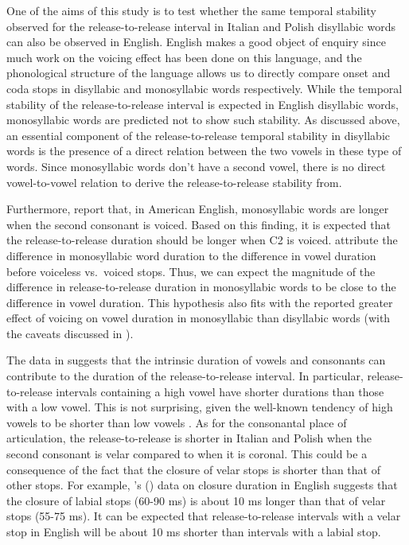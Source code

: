\documentclass[12pt,a4paper,]{article}
\begin{document}
One of the aims of this study is to test whether the same temporal
stability observed for the release-to-release interval in Italian and
Polish disyllabic words can also be observed in English. English makes a
good object of enquiry since much work on the voicing effect has been
done on this language, and the phonological structure of the language
allows us to directly compare onset and coda stops in disyllabic and
monosyllabic words respectively. While the temporal stability of the
release-to-release interval is expected in English disyllabic words,
monosyllabic words are predicted not to show such stability. As
discussed above, an essential component of the release-to-release
temporal stability in disyllabic words is the presence of a direct
relation between the two vowels in these type of words. Since
monosyllabic words don't have a second vowel, there is no direct
vowel-to-vowel relation to derive the release-to-release stability from.

Furthermore, \citet{jacewicz2009} report that, in American English,
monosyllabic words are longer when the second consonant is voiced. Based
on this finding, it is expected that the release-to-release duration
should be longer when C2 is voiced. \citet{jacewicz2009} attribute the
difference in monosyllabic word duration to the difference in vowel
duration before voiceless vs.~voiced stops. Thus, we can expect the
magnitude of the difference in release-to-release duration in
monosyllabic words to be close to the difference in vowel duration. This
hypothesis also fits with the reported greater effect of voicing on
vowel duration in monosyllabic than disyllabic words (with the caveats
discussed in ).

The data in \citet{coretta2019k} suggests that the intrinsic duration of
vowels and consonants can contribute to the duration of the
release-to-release interval. In particular, release-to-release intervals
containing a high vowel have shorter durations than those with a low
vowel. This is not surprising, given the well-known tendency of high
vowels to be shorter than low vowels
\citep{hertrich1997, esposito2002, mortensen2013, toivonen2015, kawahara2017}.
As for the consonantal place of articulation, the release-to-release is
shorter in Italian and Polish when the second consonant is velar
compared to when it is coronal. This could be a consequence of the fact
that the closure of velar stops is shorter than that of other stops. For
example, \citeauthor{sharf1962}'s (\citeyear{sharf1962}) data on closure
duration in English suggests that the closure of labial stops (60-90 ms)
is about 10 ms longer than that of velar stops (55-75 ms). It can be
expected that release-to-release intervals with a velar stop in English
will be about 10 ms shorter than intervals with a labial stop.
\end{document}
